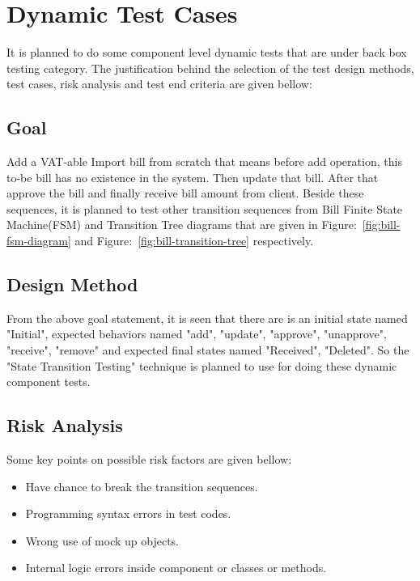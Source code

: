 \documentclass[12pt]{article}
\begin{document}
\newpage

\section{Dynamic Test Cases}
It is planned to do some component level dynamic tests that are under back box testing category. The justification behind the selection of the test design methods, test cases, risk analysis and test end criteria are given bellow: 

\subsection{Goal}
Add a VAT\--able Import bill from scratch that means before add operation, this to-be bill has no existence in the system. Then update that bill. After that approve the bill and finally receive bill amount from client. Beside these sequences, it is planned to test other transition sequences from Bill Finite State Machine(FSM) and Transition Tree diagrams that are given in Figure:~\ref{fig:bill-fsm-diagram} and Figure:~\ref{fig:bill-transition-tree} respectively.  

\subsection{Design Method}
From the above goal statement, it is seen that there are is an initial state named "Initial", expected behaviors named "add", "update", "approve", "unapprove", "receive", "remove" and expected final states named "Received", "Deleted". So the "State Transition Testing" technique is planned to use for doing these dynamic component tests.

\subsection{Risk Analysis}
Some key points on possible risk factors are given bellow:

\begin{itemize}

	\item Have chance to break the transition sequences. 
    
    \item Programming syntax errors in test codes.
    
    \item Wrong use of mock up objects.
    
    \item Internal logic errors inside component or classes or methods.

\end{itemize}
\end{document}
